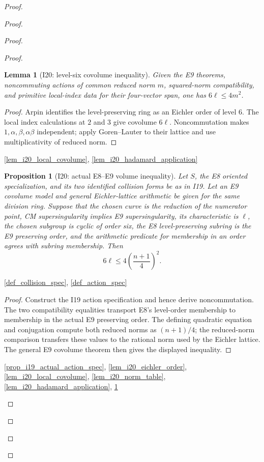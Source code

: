 \documentclass[11pt,a4paper]{article}
\numberwithin{equation}{section}
\theoremstyle{plain}\newtheorem{theorem}{Theorem}[section]\newaliascnt{proposition}{theorem}\newtheorem{proposition}[proposition]{Proposition}\aliascntresetthe{proposition}\newaliascnt{lemma}{theorem}\newtheorem{lemma}[lemma]{Lemma}\aliascntresetthe{lemma}
\theoremstyle{definition}\newaliascnt{definition}{theorem}\newtheorem{definition}[definition]{Definition}\aliascntresetthe{definition}\newaliascnt{notation}{theorem}\newtheorem{notation}[notation]{Notation}\aliascntresetthe{notation}
\providecommand{\lean}[1]{}\providecommand{\leanok}{}
\begin{document}
\begin{proof}
\begin{proof}
\begin{proof}
\begin{proof}
\begin{lemma}[I20: level-six covolume inequality]\label{lem_i20_volume}\lean{SptCM.Repair.levelSix_volume_inequality_of_local_indices}\leanok
Given the E9 theorems, noncommuting actions of common reduced norm $m$, squared-norm compatibility, and primitive local-index data for their four-vector span, one has $6\ell\le4m^2$.
\end{lemma}
\begin{proof}
Arpin identifies the level-preserving ring as an Eichler order of level $6$.  The local index calculations at $2$ and $3$ give covolume $6\ell$.  Noncommutation makes $1,\alpha,\beta,\alpha\beta$ independent; apply Goren--Lauter to their lattice and use multiplicativity of reduced norm.
\end{proof}
\begin{uses-proof}\ref{lem_i20_local_covolume}, \ref{lem_i20_hadamard_application}\end{uses-proof}

\begin{proposition}[I20: actual E8--E9 volume inequality]\label{prop_i20_actual_volume_data}\lean{SptCM.Repair.EichlerLatticeArithmetic.actual_specialized_actions_volume_of_E8_E9}\leanok
Let $S$, the E8 oriented specialization, and its two identified collision
forms be as in I19.  Let an E9 covolume model and general Eichler-lattice
arithmetic be given for the same division ring.  Suppose that the chosen
curve is the reduction of the numerator point, CM supersingularity implies
E9 supersingularity, its characteristic is $\ell$, the chosen subgroup is
cyclic of order six, the E8 level-preserving subring is the E9 preserving
order, and the arithmetic predicate for membership in an order agrees with
subring membership.  Then
\[
  6\ell\leq 4\left(\frac{n+1}{4}\right)^2 .
\]
\end{proposition}
\begin{uses-statement}\ref{def_collision_spec}, \ref{def_action_spec}\end{uses-statement}
\begin{proof}
Construct the I19 action specification and hence derive noncommutation.
The two compatibility equalities transport E8's level-order membership to
membership in the actual E9 preserving order.  The defining quadratic
equation and conjugation compute both reduced norms as $(n+1)/4$; the
reduced-norm comparison transfers these values to the rational norm used by
the Eichler lattice.  The general E9 covolume theorem then gives the displayed
inequality.
\end{proof}
\begin{uses-proof}\ref{prop_i19_actual_action_spec}, \ref{lem_i20_eichler_order},
\ref{lem_i20_local_covolume}, \ref{lem_i20_norm_table},
\ref{lem_i20_hadamard_application}, \ref{lem_i20_volume}\end{uses-proof}


\end{proof}
\end{proof}
\end{proof}
\end{proof}
\end{document}
